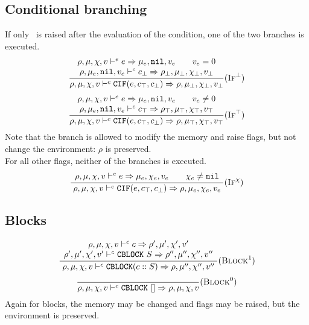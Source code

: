 \subsection{Conditional branching}
If only \nil\ is raised after the evaluation of the condition, one of the two branches is executed.
\[\dfrac{\begin{array}{c}
    \rho,\mu,\chi,v \vdash^e e \Rightarrow \mu_e,\texttt{nil},v_e \qquad v_e = 0 \\
    \rho,\mu_e,\texttt{nil},v_e \vdash^c c_\bot \Rightarrow \rho_\bot,\mu_\bot,\chi_\bot,v_\bot \\
\end{array}}{\rho,\mu,\chi,v \vdash^c \texttt{CIF}(e, c_\top, c_\bot) \Rightarrow \rho,\mu_\bot,\chi_\bot,v_\bot} (\textsc{If}^\bot)\]
\[\dfrac{\begin{array}{c}
    \rho,\mu,\chi,v \vdash^e e \Rightarrow \mu_e,\texttt{nil},v_e \qquad v_e \ne 0 \\
    \rho,\mu_e,\texttt{nil},v_e \vdash^c c_\top \Rightarrow \rho_\top,\mu_\top,\chi_\top,v_\top \\
\end{array}}{\rho,\mu,\chi,v \vdash^c \texttt{CIF}(e, c_\top, c_\bot) \Rightarrow \rho,\mu_\top,\chi_\top,v_\top} (\textsc{If}^\top)\]
Note that the branch is allowed to modify the memory and raise flags, but not change the environment: \(\rho\) is preserved.\\

For all other flags, neither of the branches is executed.
\[\dfrac{\begin{array}{c}
\rho,\mu,\chi,v \vdash^e e \Rightarrow \mu_e,\chi_e,v_e \qquad \chi_e\ne\texttt{nil} \\
\end{array}}{\rho,\mu,\chi,v \vdash^c \texttt{CIF}(e, c_\top, c_\bot) \Rightarrow \rho,\mu_e,\chi_e,v_e} (\textsc{If}^\chi)\]

\subsection{Blocks}
\[\dfrac{\begin{array}{c}
    \rho,\mu,\chi,v \vdash^c c \Rightarrow \rho',\mu',\chi',v' \\
    \rho',\mu',\chi',v' \vdash^c \texttt{CBLOCK}\ S \Rightarrow \rho'',\mu'',\chi'',v''
\end{array}}{\rho,\mu,\chi,v \vdash^c \texttt{CBLOCK}(c :: S) \Rightarrow \rho,\mu'',\chi'',v''} (\textsc{Block}^1)\]
\[\dfrac{}{\rho,\mu,\chi,v \vdash^c \texttt{CBLOCK}\ [] \Rightarrow \rho,\mu,\chi,v} (\textsc{Block}^0)\]
Again for blocks, the memory may be changed and flags may be raised, but the environment is preserved.\\

